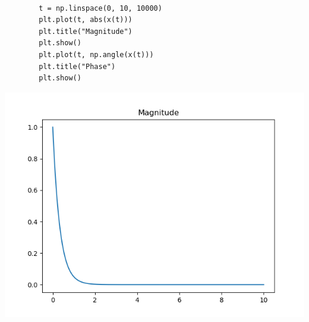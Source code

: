 \documentclass{article}
\begin{document}
\begin{enumerate}
\begin{enumerate}
\begin{lstlisting}
        
        t = np.linspace(0, 10, 10000)
        plt.plot(t, abs(x(t)))
        plt.title("Magnitude")
        plt.show()
        plt.plot(t, np.angle(x(t)))
        plt.title("Phase")
        plt.show()
        \end{lstlisting}
        \includegraphics[width = .7\textwidth]{6aM.png}
        

\end{enumerate}
\end{enumerate}
\end{document}
